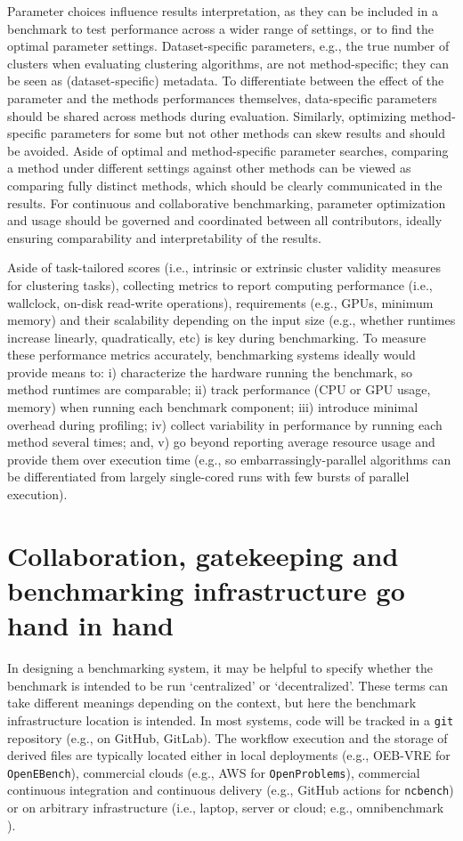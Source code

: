 \documentclass[11pt]{article}
\begin{document}
Parameter choices influence results interpretation, as they can be included in a benchmark to test performance across a wider range of settings, or to find the optimal parameter settings. 
Dataset-specific parameters, e.g., the true number of clusters when evaluating clustering algorithms, are not method-specific; they can be seen as (dataset-specific) metadata. To differentiate between the effect of the parameter and the methods performances themselves, data-specific parameters should be shared across methods during evaluation.
Similarly, optimizing method-specific parameters for some but not other methods can skew results and should be avoided. 
Aside of optimal and method-specific parameter searches, comparing a method under different settings against other methods can be viewed as comparing fully distinct methods, which should be clearly communicated in the results. 
For continuous and collaborative benchmarking, parameter optimization and usage should be governed and coordinated between all contributors, ideally ensuring comparability and interpretability of the results. 

Aside of task-tailored scores (i.e., intrinsic or extrinsic cluster validity measures for clustering tasks), collecting metrics to report computing performance (i.e., wallclock, on-disk read-write operations), requirements (e.g., GPUs, minimum memory) and their scalability depending on the input size (e.g., whether runtimes increase linearly, quadratically, etc) is key during benchmarking. To measure these performance metrics accurately, benchmarking systems ideally would provide means to: i) characterize the hardware running the benchmark, so method runtimes are comparable;  ii) track performance (CPU or GPU usage, memory) when running each benchmark component; iii) introduce minimal overhead during profiling; iv) collect variability in performance by running each method several times; and, v) go beyond reporting average resource usage and provide them over execution time (e.g., so embarrassingly-parallel algorithms can be differentiated from largely single-cored runs with few bursts of parallel execution).

\section*{Collaboration, gatekeeping and benchmarking infrastructure go hand in hand}

In designing a benchmarking system, it may be helpful to specify whether the benchmark is intended to be run `centralized' or `decentralized'. These terms can take different meanings depending on the context, but here the benchmark infrastructure location is intended. In most systems, code will be tracked in a \texttt{git} repository (e.g., on GitHub, GitLab). The workflow execution and the storage of derived files are typically located either in local deployments (e.g., OEB-VRE for \texttt{OpenEBench}), commercial clouds (e.g., AWS for \texttt{OpenProblems}), commercial continuous integration and continuous delivery (e.g., GitHub actions for \texttt{ncbench}) or on arbitrary infrastructure (i.e., laptop, server or cloud; e.g., omnibenchmark \cite{omnibenchmark}). 
\end{document}
